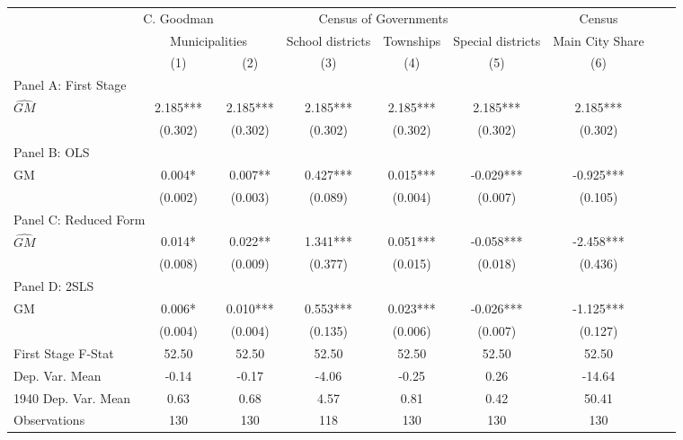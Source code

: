  \begin{tabular}{l*{8}{c}} \toprule
&\multicolumn{1}{c}{C. Goodman}&\multicolumn{4}{c}{Census of Governments}&\multicolumn{1}{c}{Census}\\\cmidrule(lr){2-2}\cmidrule(lr){3-6}\cmidrule(lr){7-7}
&\multicolumn{2}{c}{Municipalities}&\multicolumn{1}{c}{School districts}&\multicolumn{1}{c}{Townships}&\multicolumn{1}{c}{Special districts}&\multicolumn{1}{c}{Main City Share}\\\cmidrule(lr){2-3}\cmidrule(lr){4-6}\cmidrule(lr){7-7}
&\multicolumn{1}{c}{(1)}&\multicolumn{1}{c}{(2)}&\multicolumn{1}{c}{(3)}&\multicolumn{1}{c}{(4)}&\multicolumn{1}{c}{(5)}&\multicolumn{1}{c}{(6)}\\
\cmidrule(lr){1-7}
\multicolumn{6}{l}{Panel A: First Stage}\\
\cmidrule(lr){1-7}
$\widehat{GM}$  &    2.185***&    2.185***&    2.185***&    2.185***&    2.185***&    2.185***\\
                &  (0.302)   &  (0.302)   &  (0.302)   &  (0.302)   &  (0.302)   &  (0.302)   \\
\cmidrule(lr){1-7}
\multicolumn{6}{l}{Panel B: OLS}\\
\cmidrule(lr){1-7}
GM              &    0.004*  &    0.007** &    0.427***&    0.015***&   -0.029***&   -0.925***\\
                &  (0.002)   &  (0.003)   &  (0.089)   &  (0.004)   &  (0.007)   &  (0.105)   \\
\cmidrule(lr){1-7}
\multicolumn{6}{l}{Panel C: Reduced Form}\\
\cmidrule(lr){1-7}
$\widehat{GM}$  &    0.014*  &    0.022** &    1.341***&    0.051***&   -0.058***&   -2.458***\\
                &  (0.008)   &  (0.009)   &  (0.377)   &  (0.015)   &  (0.018)   &  (0.436)   \\
\cmidrule(lr){1-7}
\multicolumn{6}{l}{Panel D: 2SLS}\\
\cmidrule(lr){1-7}
GM              &    0.006*  &    0.010***&    0.553***&    0.023***&   -0.026***&   -1.125***\\
                &  (0.004)   &  (0.004)   &  (0.135)   &  (0.006)   &  (0.007)   &  (0.127)   \\
\midrule
First Stage F-Stat&    52.50   &    52.50   &    52.50   &    52.50   &    52.50   &    52.50   \\
Dep. Var. Mean  &    -0.14   &    -0.17   &    -4.06   &    -0.25   &     0.26   &   -14.64   \\
1940 Dep. Var. Mean&     0.63   &     0.68   &     4.57   &     0.81   &     0.42   &    50.41   \\
Observations    &      130   &      130   &      118   &      130   &      130   &      130   \\
 \bottomrule \end{tabular}
